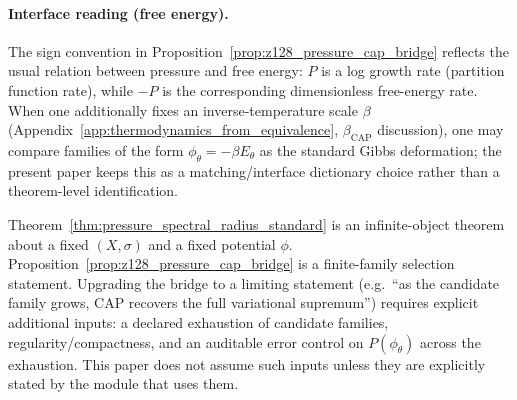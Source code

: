 \paragraph{Interface reading (free energy).}
\InterfaceTag The sign convention in Proposition~\ref{prop:z128_pressure_cap_bridge} reflects the usual relation between pressure and free energy: $P$ is a log growth rate (partition function rate), while $-P$ is the corresponding dimensionless free-energy rate.
When one additionally fixes an inverse-temperature scale $\beta$ (Appendix~\ref{app:thermodynamics_from_equivalence}, $\beta_{\mathrm{CAP}}$ discussion), one may compare families of the form $\phi_\theta=-\beta E_\theta$ as the standard Gibbs deformation; the present paper keeps this as a matching/interface dictionary choice rather than a theorem-level identification.

\begin{remark}
\label{rem:z128_pressure_cap_limit_boundary}
\AuditTag Theorem~\ref{thm:pressure_spectral_radius_standard} is an infinite-object theorem about a fixed $(X,\sigma)$ and a fixed potential $\phi$.
Proposition~\ref{prop:z128_pressure_cap_bridge} is a finite-family selection statement.
Upgrading the bridge to a limiting statement (e.g.\ ``as the candidate family grows, CAP recovers the full variational supremum'') requires explicit additional inputs: a declared exhaustion of candidate families, regularity/compactness, and an auditable error control on $P(\phi_\theta)$ across the exhaustion.
This paper does not assume such inputs unless they are explicitly stated by the module that uses them.
\end{remark}



